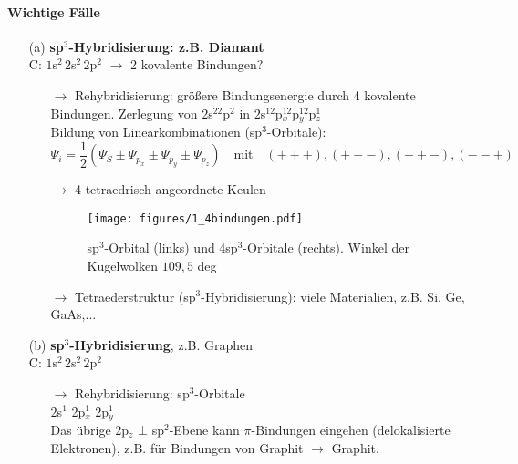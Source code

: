 \paragraph{Wichtige Fälle}
\begin{itemize}
	\item[(a)] \textbf{sp$^3$-Hybridisierung: z.B. Diamant}\\
	C: $1$s$^2 \, 2$s$^2 \, 2$p$^2$ $\rightarrow$ 2 kovalente Bindungen?\\
	\begin{itemize}
		\item[$\rightarrow$] Rehybridisierung: größere Bindungsenergie durch 4 kovalente Bindungen. Zerlegung von $2$s$^22$p$^2$ in $2$s$^12$p$_x^12$p$_y^12$p$_z^1$\\
		Bildung von Linearkombinationen (sp$^3$-Orbitale):\\
		$$\Psi_i = \frac{1}{2} (\Psi_S \pm \Psi_{p_x} \pm \Psi_{p_y} \pm \Psi_{p_z}) \quad \text{mit} \quad (+++), (+--), (-+-), (--+)$$
		\item [$\rightarrow$] 4 tetraedrisch angeordnete Keulen\\
		\begin{figure}[H]
			\centering
			\texttt{[image: figures/1\_4bindungen.pdf]}
			\caption{sp$^3$-Orbital (links) und 4sp$^3$-Orbitale (rechts). Winkel der Kugelwolken $109,5$ deg }
			\label{}
		\end{figure}
		\item[$\rightarrow$] Tetraederstruktur (sp$^3$-Hybridisierung): viele Materialien, z.B. Si, Ge, GaAs,...
	\end{itemize}
	\item[(b)] \textbf{sp$^3$-Hybridisierung}, z.B. Graphen\\
	C:  $1$s$^2 \, 2$s$^2 \, 2$p$^2$\\
	\begin{itemize}
		\begin{figure}[H]
			\centering
			\texttt{[image: figures/1\_4Kristall.pdf]}
			\caption{Winkel 120 deg}
			\label{}
		\end{figure}
		\item[$\rightarrow$] Rehybridisierung: sp$^3$-Orbitale \\
		$2$s$^1$ 2p$_x^1$ 2p$_y^1$ \\ 
		Das übrige 2p$_z$ $\bot$ sp$^2$-Ebene kann $\pi$-Bindungen eingehen (delokalisierte Elektronen), z.B. für Bindungen von Graphit $\rightarrow$ Graphit. 
	\end{itemize}
\end{itemize}

